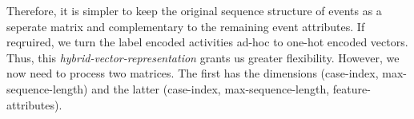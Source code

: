 \documentclass[./../../paper.tex]{subfiles}
\begin{document}
Therefore, it is simpler to keep the original sequence structure of events as a seperate matrix and complementary to the remaining event attributes. If reqruired, we turn the label encoded activities ad-hoc to one-hot encoded vectors. Thus, this \emph{hybrid-vector-representation} grants us greater flexibility. However, we now need to process two matrices. The first has the dimensions (case-index, max-sequence-length) and the latter (case-index, max-sequence-length, feature-attributes). 
\end{document}

